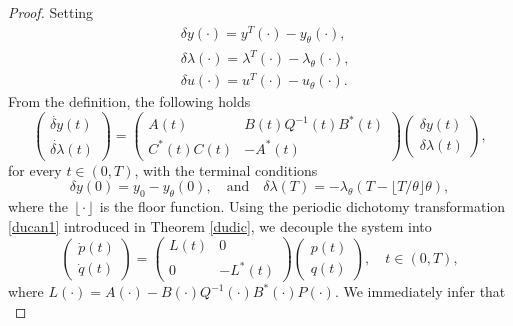 \documentclass{IEEEtran}
\begin{document}
	\begin{proof}
		Setting
		\begin{equation*}
			\begin{split}
				&\delta y(\cdot)=y^T(\cdot)-y_\theta(\cdot),\\
				&\delta \lambda(\cdot)=\lambda^T(\cdot)-\lambda_\theta(\cdot),\\
				&\delta u(\cdot)=u^T(\cdot)-u_\theta(\cdot).
			\end{split}
		\end{equation*}
		From the definition, the following holds
		\begin{equation*}
			\begin{pmatrix}
				\dot{\delta y}(t)\\\dot{\delta \lambda}(t)
			\end{pmatrix}=
			\begin{pmatrix}
				A(t) & B(t)Q^{-1}(t)B^*(t)\\C^*(t)C(t)&-A^*(t)
			\end{pmatrix}\begin{pmatrix}
				\delta y(t)\\ \delta \lambda (t)
			\end{pmatrix},
		\end{equation*}
		for every $t\in(0,T)$, with the terminal conditions
		\begin{equation*}
			\delta y(0) = y_0-y_\theta(0), \quad \text{and} \quad \delta \lambda(T) = -\lambda_\theta\left(T-\lfloor T/\theta \rfloor \theta \right),
		\end{equation*}
		where the $\left\lfloor \cdot \right\rfloor$ is the floor function. 
		Using the periodic dichotomy transformation \eqref{ducan1} introduced in Theorem \ref{dudic}, we decouple the system into
		\begin{equation*}
			\begin{pmatrix}
				\dot{p}(t)\\ \dot{q}(t)
			\end{pmatrix} =
			\begin{pmatrix}
				L(t) & 0 \\
				0 & -L^*(t)
			\end{pmatrix}
			\begin{pmatrix}
				p(t)\\ q(t)
			\end{pmatrix},\quad t\in(0,T),
		\end{equation*}
		where $L(\cdot) = A(\cdot)-B(\cdot)Q^{-1}(\cdot)B^*(\cdot)P(\cdot)$. We immediately infer that
		\begin{equation}

\end{equation}
\end{proof}
\end{document}
